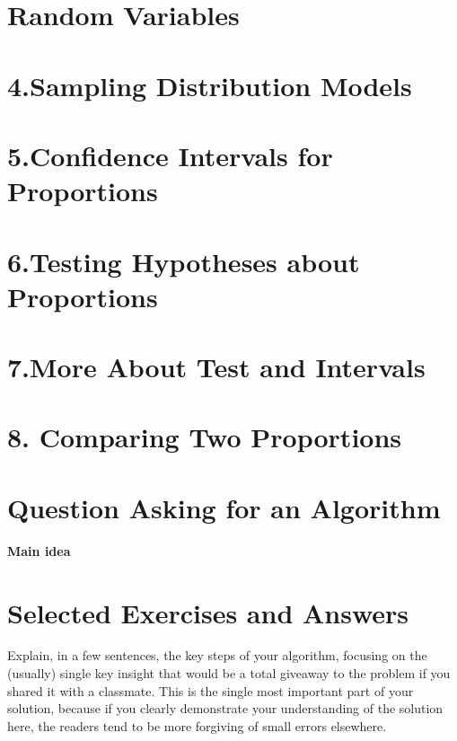 \documentclass[11pt]{article}
\begin{document}
\newpage
 \section*{Random Variables}
 \newpage
 \section*{4.Sampling Distribution Models}
  \newpage
\section*{5.Confidence Intervals for Proportions}
 \newpage
\section*{6.Testing Hypotheses about Proportions}
 \newpage
\section*{7.More About Test and Intervals}
 \newpage
\section*{8. Comparing Two Proportions}
\newpage 
\section*{Question Asking for an Algorithm}
\textbf{Main idea}\\
\section*{Selected Exercises and Answers}
 \renewcommand{\labelenumii}{\Roman{enumii}}

Explain, in a few sentences, the key steps of your algorithm, focusing on the (usually) single key insight that would be a total giveaway to the problem if you shared it with a classmate. This is the single most important part of your solution, because if you clearly demonstrate your understanding of the solution here, the readers tend to be more forgiving of small errors elsewhere.\\
\end{document}
